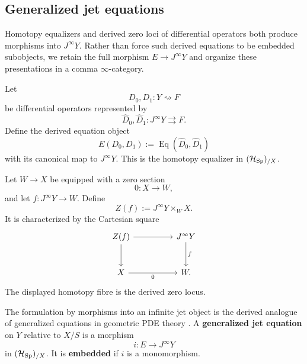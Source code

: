 \subsection{Generalized jet equations}
\label{sec:generalized-PDEs}

Homotopy equalizers and derived zero loci of differential operators both
produce morphisms into \(J^\infty Y\). Rather than force such derived
equations to be embedded subobjects, we retain the full morphism
\(E\to J^\infty Y\) and organize these presentations in a comma
\(\infty\)-category.
\begin{construction}
Let
\[
  D_0,D_1:Y\rightsquigarrow F
\]
be differential operators represented by
\[
  \widehat D_0,\widehat D_1:J^\infty Y\rightrightarrows F.
\]
Define the derived equation object
\[
  E(D_0,D_1)
  :=
  \operatorname{Eq}(\widehat D_0,\widehat D_1)
\]
with its canonical map to \(J^\infty Y\). This is the homotopy equalizer in
\((\mathcal H_{\operatorname{Sp}})_{/X}\).
\end{construction}

\begin{construction}
Let \(W\to X\) be equipped with a zero section
\[
  0:X\to W,
\]
and let \(f:J^\infty Y\to W\). Define
\[
  Z(f):=J^\infty Y\times_WX.
\]
It is characterized by the Cartesian square
\[
\begin{tikzcd}[column sep=huge,row sep=large]
Z(f) \ar[r] \ar[d]
&
J^\infty Y \ar[d,"f"]\\
X \ar[r,"0"']
&
W .
\end{tikzcd}
\]
The displayed homotopy fibre is the derived zero locus.
\end{construction}

\begin{definition}
The formulation by morphisms into an infinite jet object is the derived
analogue of generalized equations in geometric PDE theory
\cite{Marvan1986,KhavkineSchreiber2017}. A \textbf{generalized jet equation} on \(Y\) relative to \(X/S\) is a
morphism
\[
  i:E\longrightarrow J^\infty Y
\]
in \((\mathcal H_{\operatorname{Sp}})_{/X}\). It is \textbf{embedded} if \(i\) is a monomorphism.
\end{definition}

